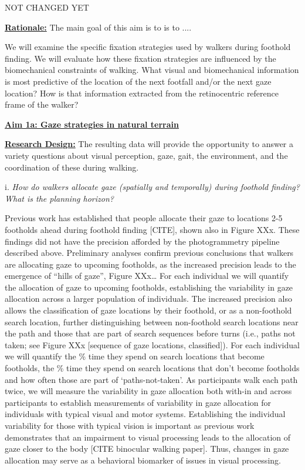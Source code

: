 
NOT CHANGED YET

\textbf{\underline{Rationale:}}  The main goal of this aim is to is to ....

We will examine the specific fixation strategies used by walkers during foothold finding.  We will evaluate how these fixation strategies are influenced by the biomechanical constraints of walking. What visual and biomechanical information is most predictive of the location of the next footfall and/or the next gaze location?  How is that information extracted from the retinocentric reference frame of the walker?


\textbf{\underline{Aim 1a: Gaze strategies in natural terrain}}



\noindent\underline{\textbf{Research Design:}} The resulting data will provide the opportunity to answer a variety questions about visual perception, gaze, gait, the environment, and the coordination of these during walking.

i. \emph{How do walkers allocate gaze (spatially and temporally) during foothold finding? What is the planning horizon?}

Previous work has established that people allocate their gaze to locations 2-5 footholds ahead during foothold finding [CITE], shown also in Figure XXx. These findings did not have the precision afforded by the photogrammetry pipeline described above. Preliminary analyses confirm previous conclusions that walkers are allocating gaze to upcoming footholds, as the increased precision leads to the emergence of ``hills of gaze'',
Figure XXx\ldots{} For each individual we will quantify the allocation of gaze to upcoming footholds, establishing the variability in gaze allocation across a larger population of individuals. The increased precision also allows the classification of gaze locations by their
foothold, or as a non-foothold search location, further distinguishing between non-foothold search locations near the path and those that are part of search sequences before turns (i.e., paths not taken; see Figure XXx [sequence of gaze locations, classified]). For each individual we will quantify the \% time they spend on search locations that become
footholds, the \% time they spend on search locations that don't become footholds and how often those are part of `paths-not-taken'. As participants walk each path twice, we will measure the variability in gaze allocation both with-in and across participants to establish measurements of variability in gaze allocation for individuals with typical visual and motor systems. Establishing the individual variability for those with typical vision is important as previous work demonstrates that an impairment to visual processing leads to the allocation of gaze closer to the body [CITE binocular walking paper]. Thus, changes in gaze allocation may serve as a behavioral biomarker of issues in visual processing.

